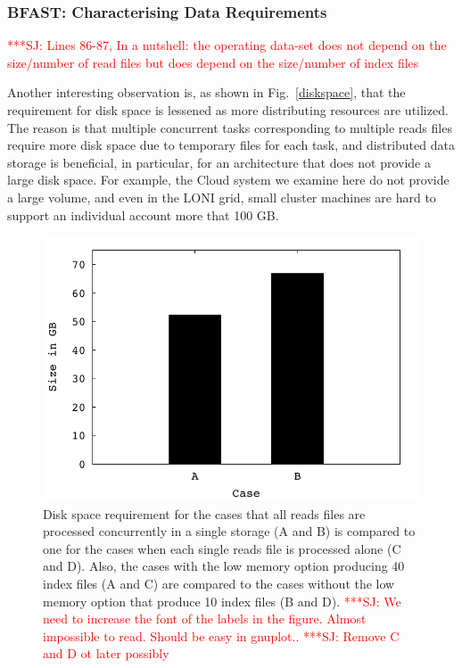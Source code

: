 \documentclass[12pt]{article}
\newcommand{\jhanote}[1]{ {\textcolor{red}     {***SJ: #1}}}
\newcommand{\jhanote}[1]{}
\begin{document}
\subsubsection{BFAST: Characterising Data Requirements}

\jhanote{Lines 86-87, In a nutshell: the operating data-set does not depend on the size/number of read files but does depend on the size/number of index files}

Another interesting observation is, as shown in Fig.~\ref{diskspace}, that the requirement for disk space is lessened as more distributing resources are utilized. The reason is that multiple concurrent tasks corresponding to multiple reads files require more disk space due to temporary files for each task, and distributed data storage is beneficial, in particular, for an architecture that does not provide a large disk space.  For example, the Cloud system we examine here do not provide a large volume, and even in the LONI grid, small cluster machines are hard to support an individual account more that 100 GB.

\begin{figure}
 \centering
\includegraphics[scale=0.66]{figures/diskspace.pdf}
\caption{\small Disk space requirement for the cases that all reads
  files are processed concurrently in a single storage (A and B) is compared to
  one for the cases when each single reads file is processed alone (C and D).  Also, the cases with the low memory option producing 40 index files (A and C) are compared to the cases without the low memory option that produce 10 index files (B and D). \jhanote{We
    need to increase the font of the labels in the figure. Almost
    impossible to read. Should be easy in gnuplot..} \jhanote{Remove C and D ot later possibly}}
  \label{fig:diskspace} 
 \end{figure}
\end{document}
